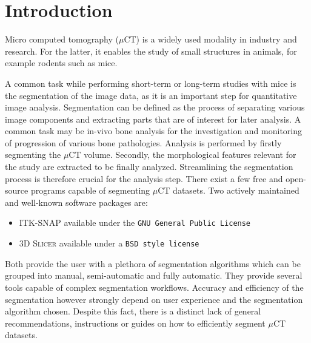 \clearpage
\section{Introduction}
\begin{body}
  Micro computed tomography ($\mu$CT) is a widely used modality in industry and research. For the latter, it enables the study of small structures in animals, for example rodents such as mice\cite{percianoInsight3DMicroCT2017}.

  A common task while performing short-term or long-term studies with mice is the segmentation of the image data, as it is an important step for quantitative image analysis\cite{sheppardTechniquesHelicalScanning2014}.
  Segmentation can be defined as the process of separating various image components and extracting parts that are of interest for later analysis\cite{percianoInsight3DMicroCT2017}.
  A common task may be in-vivo bone analysis for the investigation and monitoring of progression of various bone pathologies.
  Analysis is performed by firstly segmenting the $\mu$CT volume. Secondly, the morphological features relevant for the study are extracted to be finally analyzed. Streamlining the segmentation process is therefore crucial for the analysis step\cite{percianoInsight3DMicroCT2017,korfiatisIndependentActiveContours2017}.
	\newline
	There exist a few free and open-source programs capable of segmenting $\mu$CT datasets.
	Two actively maintained and well-known\cite{virziComprehensiveReview3D2020,mandoliniComparisonThree3D2022,virziComprehensiveReview3D2020} software packages are:
	\begin{itemize}
		\item \textsc{ITK-SNAP}\cite{yushkevichUserguided3DActive2006} available under the \texttt{GNU General Public License}\cite{licenseGnuGeneralPublic1989}
		\item \textsc{3D Slicer}\cite{kikinis3DSlicerPlatform2014} available under a \texttt{BSD style license}\cite{gaudeulPublicProvisionPrivate2005}
	\end{itemize}
	Both provide the user with a plethora of segmentation algorithms which can be grouped into manual, semi-automatic and fully automatic. They provide several tools capable of complex segmentation workflows\cite{percianoInsight3DMicroCT2017}.
	Accuracy and efficiency of the segmentation however strongly depend on user experience and the segmentation algorithm chosen\cite{mandoliniComparisonThree3D2022,aydinRELIABILITYREPRODUCIBILITYTIMEEFFICIENCY2020,arguelloComparisonSegmentationTools2019}. Despite this fact, there is a distinct lack of general recommendations, instructions or guides on how to efficiently segment $\mu$CT datasets.\\

\end{body}
